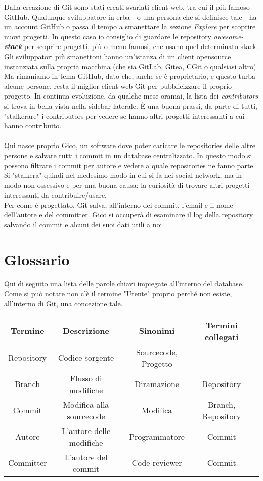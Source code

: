 Dalla creazione di Git sono stati creati svariati client web, tra cui il più famoso GitHub. Qualunque sviluppatore in erba - o una persona che si definisce tale - ha un account GitHub o passa il tempo a smanettare la sezione \textit{Explore} per scoprire nuovi progetti. In questo caso io consiglio di guardare le repository \textit{awesome-\textbf{stack}} per scoprire progetti, più o meno famosi, che usano quel determinato stack. Gli sviluppatori più smanettoni hanno un'istanza di un client opensource instanziata sulla propria macchina (che sia GitLab, Gitea, CGit o qualsiasi altro).\\
Ma rimaniamo in tema GitHub, dato che, anche se è proprietario, e questo turba alcune persone, resta il miglior client web Git per pubblicizzare il proprio progetto. In continua evoluzione, da qualche mese oramai, la lista dei \textit{contributors} si trova in bella vista nella sidebar laterale. È una buona prassi, da parte di tutti, "stalkerare" i contributors per vedere se hanno altri progetti interessanti a cui hanno contribuito. \\\\
Qui nasce proprio Gico, un software dove poter caricare le repositories delle altre persone e salvare tutti i commit in un database centralizzato. In questo modo si possono filtrare i commit per autore e vedere a quale repositories ne fanno parte. Si "stalkera" quindi nel medesimo modo in cui si fa nei social network, ma in modo non ossessivo e per una buona causa: la curiosità di trovare altri progetti interessanti da contribuire/usare.\\
Per come è progettato, Git salva, all'interno dei commit, l'email e il nome dell'autore e del committer. Gico si occuperà di esaminare il log della repository salvando il commit e alcuni dei suoi dati utili a noi.
\section{Glossario}
Qui di seguito una lista delle parole chiavi impiegate all'interno del database.\\
Come si può notare non c'è il termine "Utente" proprio perché non esiste, all'interno di Git, una concezione tale.
\begin{center}
\begin{tabular}{ |c|c|c|c|c| } 
\hline
Termine & Descrizione & Sinonimi & Termini collegati \\
\hline
Repository & Codice sorgente & Sourcecode, Progetto & \\
Branch & Flusso di modifiche & Diramazione & Repository \\
Commit & Modifica alla sourcecode & Modifica & Branch, Repository \\
Autore & L'autore delle modifiche & Programmatore & Commit \\
Committer & L'autore del commit & Code reviewer & Commit \\
\hline
\end{tabular}
\end{center}